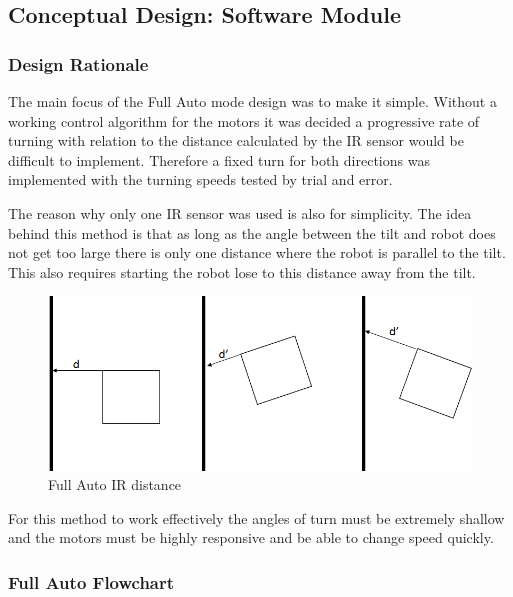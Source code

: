 \documentclass{article}
\begin{document}
	
	\subsection{Conceptual Design: Software Module }
		

	\subsubsection{Design Rationale}
	
	The main focus of the Full Auto mode design was to make it simple.
	Without a working control algorithm for the motors it was decided a progressive rate of turning with relation to the distance calculated by the IR sensor would be difficult to implement. Therefore a fixed turn for both directions was implemented with the turning speeds tested by trial and error.
	
	The reason why only one IR sensor was used is also for simplicity. The idea behind this method is that as long as the angle between the tilt and robot does not get too large there is only one distance where the robot is parallel to the tilt. This also requires starting the robot lose to this distance away from the tilt.   
	
	 	 	\begin{figure}[h]
	 	 		\includegraphics[scale=0.4]{auto_IR.png}
	 	 		\centering
	 	 		\caption{Full Auto IR distance}
	 	 	\end{figure}
	 	 	
	For this method to work effectively the angles of turn must be extremely shallow and the motors must be highly responsive and be able to change speed quickly.

	
	
	\subsubsection{Full Auto Flowchart}
\end{document}
